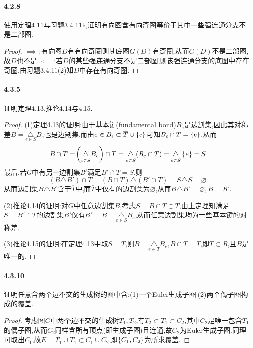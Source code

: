 \documentclass[11pt]{article}
\begin{document}
\paragraph{4.2.8}使用定理4.11与习题3.4.11b,证明有向图含有向奇圈等价于其中一些强连通分支不是二部图.
\begin{proof}
    $\implies:$有向图$D$有有向奇圈则其底图$G(D)$有奇圈,从而$G(D)$不是二部图,故$D$也不是.$\impliedby:$若$D$的某些强连通分支不是二部图,则该强连通分支的底图中存在奇圈,由习题3.4.11(2)知$D$中存在有向奇圈.
\end{proof}

\paragraph{4.3.5}证明定理4.13,推论4.14与4.15.
\begin{proof}
    (1)定理4.13的证明:由于基本键(fundamental bond)$B_e$是边割集,因此其对称差$B=\underset{e\in S}{\triangle}B_e$也是边割集,而由$e\in B_e\subset \overline{T}\cup\left\{e\right\}$可知$B_e\cap T=\left\{e\right\}$,从而
    $$B\cap T=\!\left(\underset{e\in S}{\triangle}B_e\right)\cap T=\underset{e\in S}{\triangle}(B_e\cap T)=\underset{e\in S}{\triangle}\left\{e\right\}=S$$
    最后,若$G$中有另一边割集$B'$满足$B'\cap T=S$,则$$(B\triangle B')\cap T=(B\cap T)\triangle (B'\cap T)=S\triangle S=\varnothing$$
    从而边割集$B\triangle B'$含于$\overline{T}$中,而$\overline{T}$中仅有的边割集为$\varnothing$,从而$B\triangle B'=\varnothing, B=B'$.

    (2)推论4.14的证明:对$G$中任意边割集$B$,考虑$S=B\cap T\subset T$,由上定理知满足$S=B'\cap T$的边割集$B'$仅有$B'=B=\underset{e\in S}{\triangle}B_e$,从而任意边割集均为一些基本键的对称差.

    (3)推论4.15的证明:在定理4.13中取$S=T$,则$B=\underset{e\in T}{\triangle}B_e, B\cap T=T$,即$T\subset B$,且$B$是唯一的.
\end{proof}

\paragraph{4.3.10}证明任意含两个边不交的生成树的图中含:(1)一个Euler生成子图;(2)两个偶子图构成的覆盖.
\begin{proof}
    考虑图$G$中两个边不交的生成树$T_1,T_2$,有$T_2\subset \overline{T_1}\subset C_2$,其中$C_2$是唯一包含$\overline{T_1}$的偶子图,从而$C_2$同样含所有顶点(即生成子图)且连通,故$C_2$为Euler生成子图.同理可取出$C_1$,故$E=T_1\cup \overline{T_1}\subset C_1\cup C_2$,即$\left\{C_1,C_2\right\}$为所求覆盖.
\end{proof}
\end{document}
